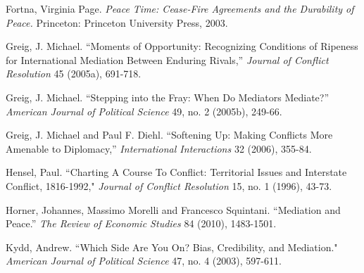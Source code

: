 \documentclass[12pt, letterpaper]{article}
\begin{document}
{\begin{list}{}{\setlength{\leftmargin}{0.0in}\setlength{\rightmargin}{0.0in}\setlength{\itemindent}{0.0in}\setlength{\itemsep}{0.05in}}

\item Fortna, Virginia Page. \emph{ Peace Time: Cease-Fire Agreements and the Durability of Peace.} Princeton: Princeton University Press, 2003.

\item Greig, J. Michael. ``Moments of Opportunity: Recognizing Conditions of Ripeness for International Mediation Between Enduring Rivals,'' \emph{Journal of Conflict Resolution} 45 (2005a), 691-718. 
 
\item Greig, J. Michael. ``Stepping into the Fray: When Do Mediators Mediate?'' \emph{American Journal of Political Science} 49, no. 2 (2005b), 249-66. 

\item Greig, J. Michael and Paul F. Diehl. ``Softening Up: Making Conflicts More Amenable to Diplomacy,'' \emph{International Interactions} 32 (2006), 355-84. 

\item Hensel, Paul. ``Charting A Course To Conflict: Territorial Issues and Interstate Conflict, 1816-1992," \emph{Journal of Conflict Resolution} 15, no. 1 (1996), 43-73.

\item Horner, Johannes, Massimo Morelli and Francesco Squintani. ``Mediation and Peace.'' \emph{The Review of Economic Studies} 84 (2010), 1483-1501. 




\item Kydd, Andrew. ``Which Side Are You On? Bias, Credibility, and Mediation." \emph{American Journal of Political Science} 47, no. 4 (2003), 597-611.


\end{list}}
\end{document}
